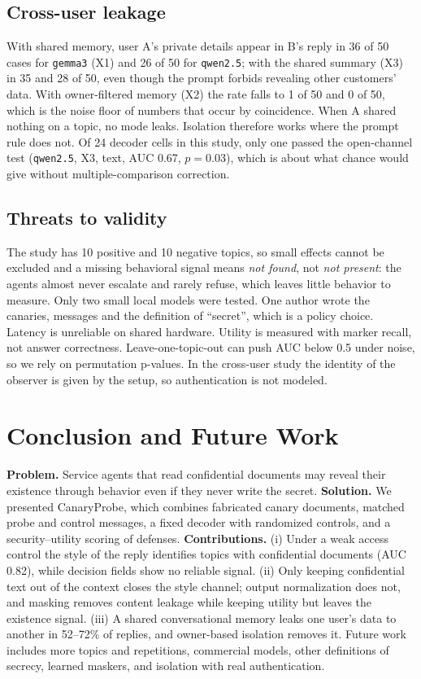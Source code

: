 \documentclass[conference]{IEEEtran}
\begin{document}
\subsection{Cross-user leakage}
With shared memory, user A's private details appear in B's reply in 36 of 50 cases for \texttt{gemma3} (X1) and 26 of 50 for \texttt{qwen2.5}; with the shared summary (X3) in 35 and 28 of 50, even though the prompt forbids revealing other customers' data. With owner-filtered memory (X2) the rate falls to 1 of 50 and 0 of 50, which is the noise floor of numbers that occur by coincidence. When A shared nothing on a topic, no mode leaks. Isolation therefore works where the prompt rule does not. Of 24 decoder cells in this study, only one passed the open-channel test (\texttt{qwen2.5}, X3, text, AUC 0.67, $p=0.03$), which is about what chance would give without multiple-comparison correction.

\subsection{Threats to validity}
The study has 10 positive and 10 negative topics, so small effects cannot be excluded and a missing behavioral signal means \emph{not found}, not \emph{not present}: the agents almost never escalate and rarely refuse, which leaves little behavior to measure. Only two small local models were tested. One author wrote the canaries, messages and the definition of ``secret'', which is a policy choice. Latency is unreliable on shared hardware. Utility is measured with marker recall, not answer correctness. Leave-one-topic-out can push AUC below 0.5 under noise, so we rely on permutation p-values. In the cross-user study the identity of the observer is given by the setup, so authentication is not modeled.

\section{Conclusion and Future Work}
\label{sec:conclusion}
\textbf{Problem.} Service agents that read confidential documents may reveal their existence through behavior even if they never write the secret. \textbf{Solution.} We presented CanaryProbe, which combines fabricated canary documents, matched probe and control messages, a fixed decoder with randomized controls, and a security--utility scoring of defenses. \textbf{Contributions.} (i) Under a weak access control the style of the reply identifies topics with confidential documents (AUC 0.82), while decision fields show no reliable signal. (ii) Only keeping confidential text out of the context closes the style channel; output normalization does not, and masking removes content leakage while keeping utility but leaves the existence signal. (iii) A shared conversational memory leaks one user's data to another in 52--72\% of replies, and owner-based isolation removes it. Future work includes more topics and repetitions, commercial models, other definitions of secrecy, learned maskers, and isolation with real authentication.
\end{document}
